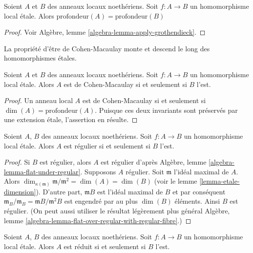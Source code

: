 \begin{proposition}
\label{proposition-etale-depth}
Soient $A$ et $B$ des anneaux locaux noethériens.
Soit $f : A \to B$ un homomorphisme local \'etale.
Alors $\text{profondeur}(A) = \text{profondeur}(B)$
\end{proposition}

\begin{proof}
Voir Algèbre, lemme \ref{algebra-lemma-apply-grothendieck}.
\end{proof}

\begin{proposition}
\label{proposition-etale-CM}
\begin{slogan}
La propriété d'être de Cohen-Macaulay monte et descend le long des homomorphismes \'etales.
\end{slogan}
Soient $A$ et $B$ des anneaux locaux noethériens.
Soit $f : A \to B$ un homomorphisme local \'etale.
Alors $A$ est de Cohen-Macaulay si et seulement si $B$ l'est.
\end{proposition}

\begin{proof}
Un anneau local $A$ est de Cohen-Macaulay si et seulement si $\dim(A) = \text{profondeur}(A)$.
Puisque ces deux invariants sont préservés par une extension \'etale,
l'assertion en résulte.
\end{proof}

\begin{proposition}
\label{proposition-etale-regular}
Soient $A$, $B$ des anneaux locaux noethériens.
Soit $f : A \to B$ un homomorphisme local \'etale.
Alors $A$ est régulier si et seulement si $B$ l'est.
\end{proposition}

\begin{proof}
Si $B$ est régulier, alors $A$ est régulier d'après
Algèbre, lemme \ref{algebra-lemma-flat-under-regular}.
Supposons $A$ régulier. Soit $\mathfrak m$ l'idéal maximal
de $A$. Alors $\dim_{\kappa(\mathfrak m)} \mathfrak m/\mathfrak m^2 =
\dim(A) = \dim(B)$ (voir le lemme \ref{lemma-etale-dimension}).
D'autre part, $\mathfrak mB$ est l'idéal maximal de
$B$ et par conséquent $\mathfrak m_B/\mathfrak m_B = \mathfrak mB/\mathfrak m^2B$
est engendré par au plus $\dim(B)$ éléments. Ainsi $B$ est régulier.
(On peut aussi utiliser le résultat légèrement plus général
Algèbre, lemme \ref{algebra-lemma-flat-over-regular-with-regular-fibre}.)
\end{proof}


\begin{proposition}
\label{proposition-etale-reduced}
Soient $A$, $B$ des anneaux locaux noethériens.
Soit $f : A \to B$ un homomorphisme local \'etale.
Alors $A$ est réduit si et seulement si $B$ l'est.
\end{proposition}

